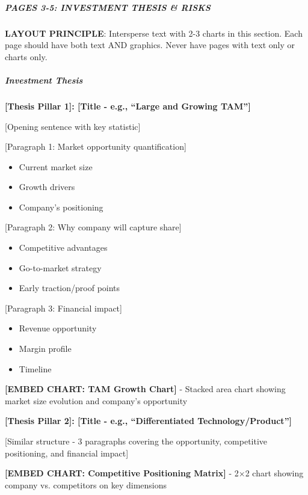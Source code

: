 \documentclass[11pt]{article}
\begin{document}
\subparagraph{PAGES 3-5: INVESTMENT THESIS \& RISKS}\mbox{}\par

\textbf{LAYOUT PRINCIPLE}: Intersperse text with 2-3 charts in this section. Each page should have both text AND graphics. Never have pages with text only or charts only.


\subparagraph{Investment Thesis}\mbox{}\par

\textbf{[Thesis Pillar 1]: [Title - e.g., ``Large and Growing TAM'']}


[Opening sentence with key statistic]


[Paragraph 1: Market opportunity quantification]

\begin{itemize}[leftmargin=*,itemsep=2pt,topsep=2pt]
\item {} Current market size
\item {} Growth drivers
\item {} Company's positioning
\end{itemize}

[Paragraph 2: Why company will capture share]

\begin{itemize}[leftmargin=*,itemsep=2pt,topsep=2pt]
\item {} Competitive advantages
\item {} Go-to-market strategy
\item {} Early traction/proof points
\end{itemize}

[Paragraph 3: Financial impact]

\begin{itemize}[leftmargin=*,itemsep=2pt,topsep=2pt]
\item {} Revenue opportunity
\item {} Margin profile
\item {} Timeline
\end{itemize}

\textbf{[EMBED CHART: TAM Growth Chart]} - Stacked area chart showing market size evolution and company's opportunity


\textbf{[Thesis Pillar 2]: [Title - e.g., ``Differentiated Technology/Product'']}


[Similar structure - 3 paragraphs covering the opportunity, competitive positioning, and financial impact]


\textbf{[EMBED CHART: Competitive Positioning Matrix]} - 2×2 chart showing company vs. competitors on key dimensions
\end{document}
